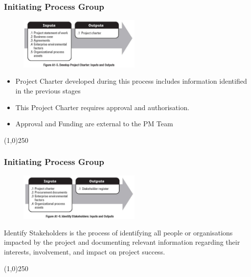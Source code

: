 \begin{frame}
\frametitle{Initiating Process Group}
\begin{figure}
	\centering
		\includegraphics[width = 6cm]{images/FigA1-5.jpg}
	\label{fig:A1-5}
\end{figure} 
\begin{itemize}
	\item Project Charter developed during this process includes information identified in the previous stages
	\item This Project Charter requires approval and authorisation.
	\item Approval and Funding are external to the PM Team
\end{itemize}
\end{frame}
\begin{center}\line(1,0){250}\end{center}



\begin{frame}
\frametitle{Initiating Process Group}
\begin{figure}
	\centering
		\includegraphics[width = 6cm]{images/FigA1-6.jpg}
	\label{fig:A1-6}
\end{figure} 
Identify Stakeholders is the process of identifying all people or organisations impacted by the project and documenting relevant information regarding their interests, involvement, and impact on project success.
\end{frame}
\begin{center}\line(1,0){250}\end{center}



